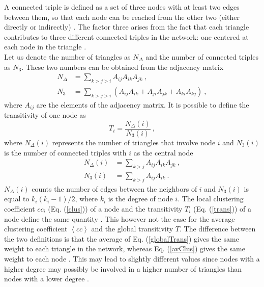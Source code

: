 \documentclass[11 pt , letterpaper , twoside , openright]{book}
\begin{document}
\newline
A connected triple is defined as a set of three nodes with at least two edges between them, so that each node can be reached from the other two (either directly or indirectly) \cite{Newman2003}. The factor three arises from the fact that each triangle contributes to three different connected triples in the network: one centered at each node in the triangle \cite{F.Costa2007}. \\
\newline
Let us denote the number of triangles as $N_{\Delta}$ and the number of connected triples as $N_3$. These two numbers can be obtained from the adjacency matrix \cite{F.Costa2007}
\begin{align}
	N_{\Delta} &= \sum_{k > j > i} A_{ij}A_{ik}A_{jk} \ , \\
	N_3 &= \sum_{k > j > i} (A_{ij}A_{ik} + A_{ji}A_{jk} + A_{ki}A_{kj}) \ ,
\end{align}
\newpage
\noindent
where $A_{ij}$ are the elements of the adjacency matrix. It is possible to define the transitivity of one node as \cite{F.Costa2007}
\begin{equation}\label{trans}
	T_i = \frac{N_{\Delta}(i)}{N_3(i)} \ ,
\end{equation}
where $N_{\Delta}(i)$ represents the number of triangles that involve node $i$ and $N_3(i)$ is the number of connected triples with $i$ as the central node \cite{F.Costa2007}
\begin{align}
	N_{\Delta}(i) &= \sum_{k > j} A_{ij}A_{ik}A_{jk} \ , \\
	N_3(i) &= \sum_{k > j} A_{ij}A_{ik} \ .
\end{align}
$N_{\Delta}(i)$ counts the number of edges between the neighbors of $i$ and $N_3(i)$ is equal to $k_i(k_i-1)/2$, where $k_i$ is the degree of node $i$. The local clustering coefficient $cc_i$ (Eq. (\ref{clus})) of a node and the transitivity $T_i$ (Eq. (\ref{trans})) of a node define the same quantity \cite{F.Costa2007}. This however not the case for the average clustering coefficient $\left<cc\right>$ and the global transitivity $T$. The difference between the two definitions is that the average of Eq. (\ref{globalTrans}) gives the same weight to each triangle in the network, whereas Eq. (\ref{avClus}) gives the same weight to each node \cite{Newman2003}. This may lead to slightly different values since nodes with a higher degree may possibly be involved in a higher number of triangles than nodes with a lower degree \cite{F.Costa2007}.
	
\end{document}
